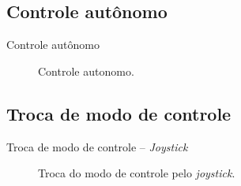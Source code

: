 \documentclass{if-beamer}
\begin{document}
\subsection*{Controle autônomo}

\begin{frame}{Controle autônomo}
	
	\begin{figure}[H]
		\centering
		\caption{Controle autonomo.}
		\label{fig:microautoware_testing_autonomous_mode}
	\end{figure}
	
\end{frame}

\subsection*{Troca de modo de controle}

\begin{frame}{Troca de modo de controle -- \textit{Joystick}}
	
	\begin{figure}[H]
		\centering
		\caption{Troca do modo de controle pelo \textit{joystick}.}
		\label{fig:microautoware_testing_autonomous_w_control_mode_change}
	\end{figure}
		
\end{frame}
\end{document}
